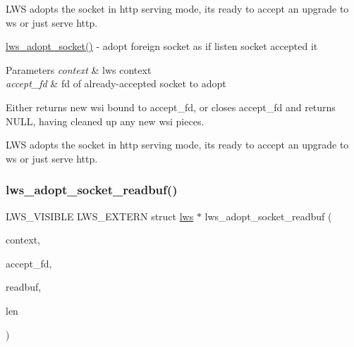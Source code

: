 L\+WS adopts the socket in http serving mode, it\textquotesingle{}s ready to accept an upgrade to ws or just serve http.

\hyperlink{group__sock-adopt_ga2003db73fc10b05b8e17a9ee715727a9}{lws\+\_\+adopt\+\_\+socket()} -\/ adopt foreign socket as if listen socket accepted it 
\begin{DoxyParams}{Parameters}
{\em context} & lws context \\
\hline
{\em accept\+\_\+fd} & fd of already-\/accepted socket to adopt\\
\hline
\end{DoxyParams}
Either returns new wsi bound to accept\+\_\+fd, or closes accept\+\_\+fd and returns N\+U\+LL, having cleaned up any new wsi pieces.

L\+WS adopts the socket in http serving mode, it\textquotesingle{}s ready to accept an upgrade to ws or just serve http. \mbox{\label{group__sock-adopt_ga3c98a2ea8006836738b9260257bce69d}} 
\subsubsection{\texorpdfstring{lws\+\_\+adopt\+\_\+socket\+\_\+readbuf()}{lws\_adopt\_socket\_readbuf()}}
{\footnotesize\ttfamily L\+W\+S\+\_\+\+V\+I\+S\+I\+B\+LE L\+W\+S\+\_\+\+E\+X\+T\+E\+RN struct \hyperlink{structlws}{lws} $\ast$ lws\+\_\+adopt\+\_\+socket\+\_\+readbuf (\begin{DoxyParamCaption}\item[{struct \hyperlink{structlws__context}{lws\+\_\+context} $\ast$}]{context,  }\item[{lws\+\_\+sockfd\+\_\+type}]{accept\+\_\+fd,  }\item[{const char $\ast$}]{readbuf,  }\item[{size\+\_\+t}]{len }\end{DoxyParamCaption})}

